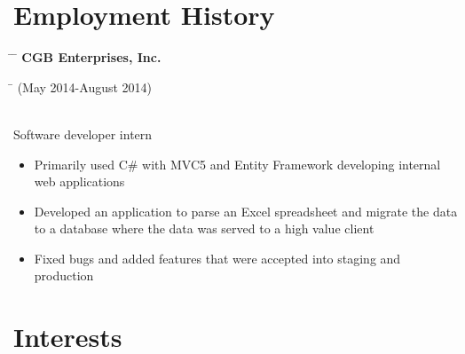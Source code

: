 \documentclass[10pt]{article} %
\begin{document}

\section{Employment History}
\vspace{-6mm}

\parbox{0.5\textwidth}{ %
\begin{tabbing} %
\hspace{2cm} \= \hspace{3cm} \= \kill %
\textbf{CGB Enterprises, Inc.}
\end{tabbing}}
\hfill %
\parbox{0.5\textwidth}{ %
\begin{tabbing} %
\hspace{5cm} \= \kill %
(May 2014-August 2014)
\end{tabbing}}
\vspace{-3mm}
\\Software developer intern
\vspace{-2mm}
\begin{itemize}
\item Primarily used C\# with MVC5 and Entity Framework developing internal web applications
\vspace{-3mm}
\item Developed an application to parse an Excel spreadsheet and migrate the data to a database where the data was served to a high value client
\vspace{-3mm}
\item Fixed bugs and added features that were accepted into staging and production
\vspace{-3mm}
\end{itemize}


\section{Interests}
\vspace{-3mm}

\end{document}
